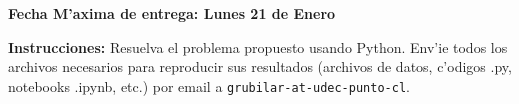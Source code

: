 \documentclass[11pt]{exam}
\begin{document}
\firstpageheadrule
\runningheadrule
{}
\cfoot{ }
\begin{flushleft}
\vspace{0.2in}
\vspace{0.25cm}
\end{flushleft}

\begin{center}
\textbf{Fecha M'axima de entrega: Lunes 21 de Enero}
\end{center}
\textbf{Instrucciones:} Resuelva el problema propuesto usando Python. Env'ie todos los archivos necesarios para reproducir sus resultados (archivos de datos, c'odigos .py, notebooks .ipynb, etc.) por email a \texttt{grubilar-at-udec-punto-cl}.

\bigskip
\end{document}

